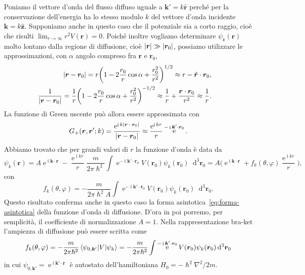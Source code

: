 \documentclass[a4paper,fleqn,twoside,12pt]{article}
\renewcommand{\phi}{\varphi}
\newcommand*{\dd}{\mathop{}\!\mathrm{d}} %
\DeclareMathOperator{\e}{\mathrm{e}} %
\DeclareMathOperator{\uimm}{\mathrm{i}} %
\DeclarePairedDelimiter{\abs}{\lvert}{\rvert}
\newcommand*{\versor}[1]{\hat{\bm{#1}}}
\begin{document}
Poniamo il vettore d'onda del flusso diffuso uguale a $\bm{k}' = k\versor{r}$
perché per la conservazione dell'energia ha lo stesso modulo $k$ del vettore
d'onda incidente $\bm{k} = k\versor{z}$.  Supponiamo anche in questo caso che il
potenziale sia a corto raggio, cioè che risulti
$\lim_{r \to \infty} r^{2}V(\bm{r}) = 0$.  Poiché inoltre vogliamo determinare
$\psi_{k}(\bm{r})$ molto lontano dalla regione di diffusione, cioè
$\abs{\bm{r}} \gg \abs{\bm{r}_{0}}$, possiamo utilizzare le approssimazioni, con
$\alpha$ angolo compreso fra $\bm{r}$ e $\bm{r}_{0}$,
\begin{subequations}
  \begin{align}
    \begin{split}
      \abs{\bm{r} - \bm{r}_{0}} &=
      r\bigg(1-2\frac{r_{0}}{r}\cos\alpha+\frac{r_{0}^{2}}{r^{2}}\bigg)^{1/2}
      \approx r - \versor{r}\cdot\bm{r}_{0},
    \end{split} \\
    \begin{split}
      \frac{1}{\abs{\bm{r} - \bm{r}_{0}}} &= \frac{1}{r}\bigg(1 -
      2\frac{r_{0}}{r}\cos\alpha + \frac{r_{0}^{2}}{r^{2}}\bigg)^{-1/2} \approx
      \frac{1}{r} + \frac{\bm{r}\cdot\bm{r}_{0}}{r^{2}} \approx \frac{1}{r}.
    \end{split}
  \end{align}
\end{subequations}
La funzione di Green uscente può allora essere approssimata con
\begin{equation}
  G_{+}(\bm{r},\bm{r}';k) = \frac{\e^{\uimm k\abs{\bm{r} -
        \bm{r}_{0}}}}{\abs{\bm{r} - \bm{r}_{0}}} \approx \frac{\e^{\uimm kr}}{r}
  \e^{-\uimm \bm{k}'\cdot\bm{r}_{0}}.
\end{equation}
Abbiamo trovato che per grandi valori di $r$ la funzione d'onda è data da
\begin{equation}
  \label{eq:bar}
  \psi_{k}(\bm{r}) = A\e^{\uimm \bm{k}\cdot\bm{r}} - \frac{\e^{\uimm kr}}{r}
  \frac{m}{2\pi\hslash^{2}} \int \e^{-\uimm \bm{k}'\cdot\bm{r}_{0}}
  V(\bm{r}_{0}) \psi_{k}(\bm{r}_{0}) \dd^{3}\bm{r}_{0} = A\bigg(\e^{\uimm
    \bm{k}\cdot\bm{r}} + f_{k}(\theta,\phi)\frac{\e^{\uimm kr}}{r}\bigg),
\end{equation}
con
\begin{equation}
  f_{k}(\theta,\phi) = -\frac{m}{2\pi\hslash^{2}A} \int\e^{-\uimm
    \bm{k}'\cdot\bm{r}_{0}} V(\bm{r}_{0}) \psi_{k}(\bm{r}_{0})\dd^{3}\bm{r}_{0}.
\end{equation}
Questo risultato conferma anche in questo caso la forma
asintotica~\eqref{eq:forma-asintotica} della funzione d'onda di diffusione.
D'ora in poi porremo, per semplicità, il coefficiente di normalizzazione $A=1$.
Nella rappresentazione bra-ket l'ampiezza di diffusione può essere scritta come
\begin{equation}
  \label{eq:ampiezza-braket}
  f_{k}(\theta,\phi) = -\frac{m}{2\pi\hslash^{2}} \braket{\psi_{0,\bm{k}'} | V |
    \psi_{k}} = -\frac{m}{2\pi\hslash^{2}} \int\e^{-\uimm
    \bm{k}'\cdot\bm{r}_{0}} V(\bm{r}_{0}) \psi_{k}(\bm{r}_{0}) \dd^{3}\bm{r}_{0}
\end{equation}
in cui $\psi_{0,\bm{k'}} = \e^{\uimm \bm{k}'\cdot\bm{r}}$ è autostato
dell'hamiltoniana $H_{0} = -\hslash^{2}\nabla^{2}/2m$.
\end{document}
